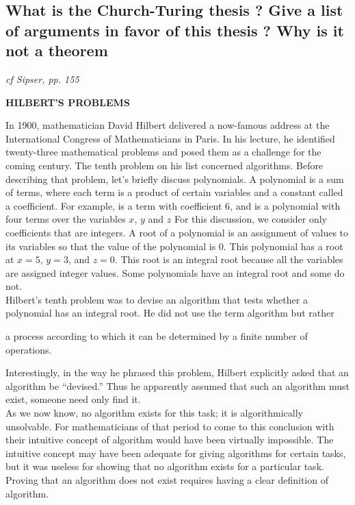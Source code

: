\documentclass[main.tex]{subfiles}
\begin{document}
\subsection{What is the Church-Turing thesis ? Give a list of arguments in favor of this thesis ? Why is it not a theorem}
\emph{cf Sipser, pp. 155}
\par\textbf{HILBERT’S PROBLEMS}
\par In 1900, mathematician David Hilbert delivered a now-famous address at the
International Congress of Mathematicians in Paris. In his lecture, he identified twenty-three mathematical problems and posed them as a challenge for the
coming century. The tenth problem on his list concerned algorithms.
Before describing that problem, let’s briefly discuss polynomials. A polynomial is a sum of terms, where each term is a product of certain variables and a constant called a coefficient. For example, 
is a term with coefficient 6, and
is a polynomial with four terms over the variables $x$, $y$ and $z$ For this discussion,
we consider only coefficients that are integers. A root of a polynomial is an
assignment of values to its variables so that the value of the polynomial is 0.
This polynomial has a root at $x = 5$, $y = 3$, and $z = 0$. This root is an integral
root because all the variables are assigned integer values. Some polynomials have
an integral root and some do not. \\
Hilbert’s tenth problem was to devise an algorithm that tests whether a polynomial has an integral root. He did not use the term algorithm but rather
\begin{quoting}[font=itshape, begintext={``}, endtext={''}]
a process according to which it can be determined by a finite number of operations.
\end{quoting}
Interestingly, in the way he phrased this problem, Hilbert explicitly
asked that an algorithm be “devised.” Thus he apparently assumed that such an
algorithm must exist, someone need only find it. \\
As we now know, no algorithm exists for this task; it is algorithmically unsolvable. For mathematicians of that period to come to this conclusion with their
intuitive concept of algorithm would have been virtually impossible. The intuitive concept may have been adequate for giving algorithms for certain tasks, but
it was useless for showing that no algorithm exists for a particular task. Proving
that an algorithm does not exist requires having a clear definition of algorithm.
\end{document}
